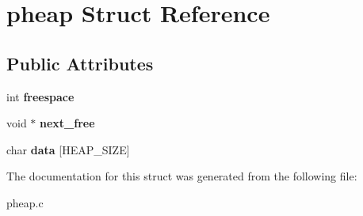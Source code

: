 \hypertarget{structpheap}{\section{pheap Struct Reference}
\label{structpheap}
}
\subsection*{Public Attributes}
\begin{DoxyCompactItemize}
\item 
\hypertarget{structpheap_a9c13038c237c0717923f1bb4b1b3dbc0}{int {\bfseries freespace}}\label{structpheap_a9c13038c237c0717923f1bb4b1b3dbc0}

\item 
\hypertarget{structpheap_ad0eb7c1e678be6e9e317e285c89733f5}{void $\ast$ {\bfseries next\-\_\-free}}\label{structpheap_ad0eb7c1e678be6e9e317e285c89733f5}

\item 
\hypertarget{structpheap_a764b124da066d09a795d4eb0f111069e}{char {\bfseries data} \mbox{[}H\-E\-A\-P\-\_\-\-S\-I\-Z\-E\mbox{]}}\label{structpheap_a764b124da066d09a795d4eb0f111069e}

\end{DoxyCompactItemize}


The documentation for this struct was generated from the following file\-:\begin{DoxyCompactItemize}
\item 
pheap.\-c\end{DoxyCompactItemize}
